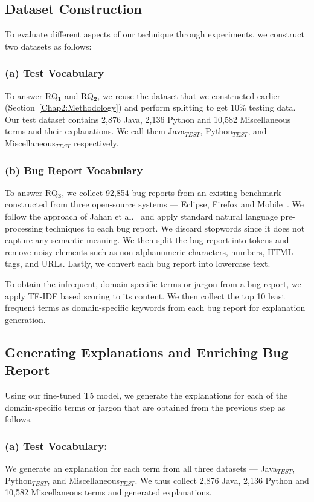 \subsection{Dataset Construction}
To evaluate different aspects of our technique through experiments, we construct two datasets as follows:

\subsubsection{(a) Test Vocabulary} To answer RQ$\mathbf{_1}$ and RQ$\mathbf{_2}$, we reuse the dataset that we constructed earlier (Section~\ref{Chap2:Methodology}) and perform splitting to get 10\% testing data. Our test dataset contains 2,876 Java, 2,136 Python and 10,582 Miscellaneous terms and their explanations. We call them Java$_{TEST}$, Python$_{TEST}$, and Miscellaneous$_{TEST}$ respectively.

\subsubsection{(b) Bug Report Vocabulary} To answer RQ$\mathbf{_3}$, we collect 92,854 bug reports from an existing benchmark constructed from three open-source systems --- Eclipse, Firefox and Mobile~\cite{jahan2023towards}. We follow the approach of Jahan et al.~\cite{jahan2023towards} and apply standard natural language pre-processing techniques to each bug report. We discard stopwords since it does not capture any semantic meaning. We then split the bug report into tokens and remove noisy elements such as non-alphanumeric characters, numbers, HTML tags, and URLs. Lastly, we convert each bug report into lowercase text.

To obtain the infrequent, domain-specific terms or jargon from a bug report, we apply \acrshort{TF-IDF} based scoring to its content. We then collect the top 10 least frequent terms as domain-specific keywords from each bug report for explanation generation.

\subsection{Generating Explanations and Enriching Bug Report}\label{bugenricher:testdataset}
Using our fine-tuned T5 model, we generate the explanations for each of the domain-specific terms or jargon that are obtained from the previous step as follows. 

\subsubsection{(a) Test Vocabulary:} We generate an explanation for each term from all three datasets --- Java$_{TEST}$, Python$_{TEST}$, and Miscellaneous$_{TEST}$. We thus collect 2,876 Java, 2,136 Python and 10,582 Miscellaneous terms and generated explanations.

